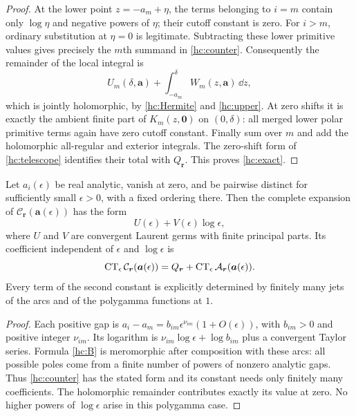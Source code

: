 \begin{proof}
At the lower point $z=-a_m+\eta$, the terms belonging to $i=m$ contain
only $\log\eta$ and negative powers of $\eta$; their cutoff constant
is zero. For $i>m$, ordinary substitution at $\eta=0$ is legitimate.
Subtracting these lower primitive values gives precisely the $m$th
summand in \eqref{hc:counter}. Consequently the remainder of the local
integral is
\[
 U_m(\delta,\boldsymbol a)
       +\int_{-a_m}^{\delta}W_m(z,\boldsymbol a)\,\dd z,
\]
which is jointly holomorphic, by \eqref{hc:Hermite} and
\eqref{hc:upper}. At zero shifts it is exactly the ambient finite part
of $K_m(z,\boldsymbol0)$ on $(0,\delta)$: all merged lower polar
primitive terms again have zero cutoff constant. Finally sum over $m$
and add the holomorphic all-regular and exterior integrals. The
zero-shift form of \eqref{hc:telescope} identifies their total with
$Q_{\boldsymbol r}$. This proves \eqref{hc:exact}.
\end{proof}

\begin{corollary}\label{hc:arcs}
Let $a_i(\epsilon)$ be real analytic, vanish at zero, and be pairwise
distinct for sufficiently small $\epsilon>0$, with a fixed ordering
there. Then the complete expansion of
$\mathcal C_{\boldsymbol r}(\boldsymbol a(\epsilon))$ has the form
\[
 U(\epsilon)+V(\epsilon)\log\epsilon,
\]
where $U$ and $V$ are convergent Laurent germs with finite principal
parts. Its coefficient independent of $\epsilon$ and $\log\epsilon$ is
\begin{equation}\label{hc:arc-constant}
 \operatorname{CT}_{\epsilon}\mathcal C_{\boldsymbol r}(\boldsymbol a(\epsilon))
 =Q_{\boldsymbol r}
       +\operatorname{CT}_{\epsilon}\mathcal A_{\boldsymbol r}(\boldsymbol a(\epsilon)).
\end{equation}
Every term of the second constant is explicitly determined by finitely
many jets of the arcs and of the polygamma functions at $1$.
\end{corollary}

\begin{proof}
Each positive gap is
$a_i-a_m=b_{im}\epsilon^{\nu_{im}}(1+O(\epsilon))$, with
$b_{im}>0$ and positive integer $\nu_{im}$. Its logarithm is
$\nu_{im}\log\epsilon+\log b_{im}$ plus a convergent Taylor series.
Formula \eqref{hc:B} is meromorphic after composition with these arcs:
all possible poles come from a finite number of powers of nonzero
analytic gaps. Thus \eqref{hc:counter} has the stated form and its
constant needs only finitely many coefficients. The holomorphic
remainder contributes exactly its value at zero. No higher powers
of $\log\epsilon$ arise in this polygamma case.
\end{proof}

